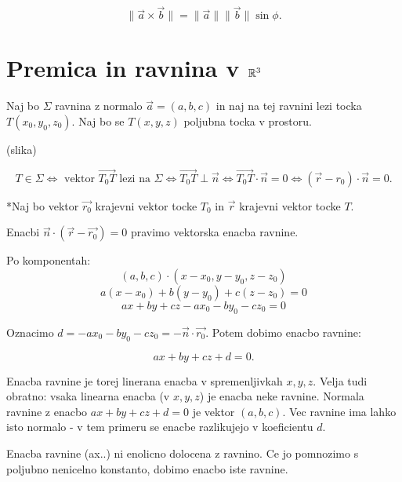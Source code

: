 \documentclass{report}
\begin{document}
\[
\|\vec{a} \times \vec{b}\| = \|\vec{a}\| \|\vec{b}\| \sin \phi
.\]



\section{Premica in ravnina v $\mathbb{R}^3$}



Naj bo $\Sigma$ ravnina z normalo  $\vec{a} = (a,b,c)$ in naj na tej ravnini lezi tocka $T(x_0,y_0,z_0)$. Naj bo se $T(x,y,z)$ poljubna tocka v prostoru.


(slika)

\[
	T \in \Sigma \iff \text{ vektor } \vec{T_{0}T} \text{ lezi na } \Sigma \iff  \vec{T_{0}T} \perp \vec{n} \iff  \vec{T_{0}T} \cdot \vec{n} = 0 \iff \left( \vec{r} - r_0 \right) \cdot \vec{n} = 0
.\]

*Naj bo vektor $\vec{r_0}$ krajevni vektor tocke $T_0$ in $\vec{r}$ krajevni vektor tocke $T$.

Enacbi  $\vec{n} \cdot \left( \vec{r} - \vec{r_0} \right) = 0 $ pravimo vektorska enacba ravnine.

Po komponentah: $$\left( a,b,c \right) \cdot \left( x - x_0, y - y_0, z - z_0 \right)$$
$$a (x- x_0) + b(y - y_0) + c(z - z_0) = 0$$
$$ax + by + cz - ax_0 - by_0 - cz_0 = 0$$


Oznacimo $d = -ax_0 - by_0 - cz_0 = - \vec{n} \cdot \vec{r_0}$. Potem dobimo enacbo ravnine:

\[
ax + by + cz + d = 0
.\]

Enacba ravnine je torej linerana enacba v spremenljivkah $x,y,z$. Velja tudi obratno: vsaka linearna enacba (v $x,y,z$) je enacba neke ravnine. Normala ravnine z enacbo $ax + by + cz + d = 0$ je vektor  $(a,b,c)$. Vec ravnine ima lahko isto normalo - v tem primeru se enacbe razlikujejo v koeficientu $d$.



Enacba ravnine (ax..) ni enolicno dolocena z ravnino. Ce jo pomnozimo s poljubno nenicelno konstanto, dobimo enacbo iste ravnine.
\end{document}
